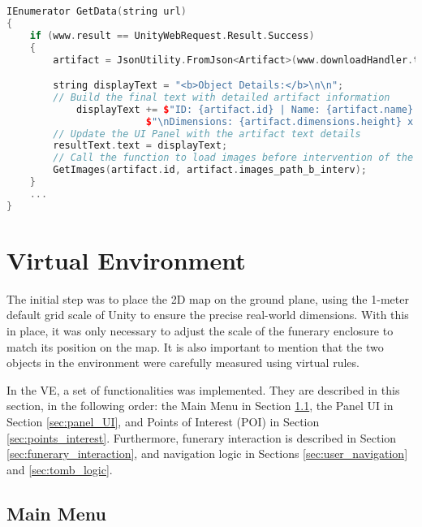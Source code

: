 \begin{lstlisting}[language=C++,label={lst:get_data}, caption={Method used to load object data from the database},float]
    IEnumerator GetData(string url)
{   
    if (www.result == UnityWebRequest.Result.Success)
    {
        artifact = JsonUtility.FromJson<Artifact>(www.downloadHandler.text);

        string displayText = "<b>Object Details:</b>\n\n";
        // Build the final text with detailed artifact information
            displayText += $"ID: {artifact.id} | Name: {artifact.name} \nMaterial: {artifact.material} | Epoch: {artifact.epoch} \nProvenance: {artifact.provenance}" +
                        $"\nDimensions: {artifact.dimensions.height} x {artifact.dimensions.width} cm, Weight: {Mathf.Round(artifact.dimensions.weight * 10.0f) * 0.1f} g";
        // Update the UI Panel with the artifact text details
        resultText.text = displayText;
        // Call the function to load images before intervention of the artifact
        GetImages(artifact.id, artifact.images_path_b_interv);
    }
    ...
}
\end{lstlisting}


\section{Virtual Environment}
\label{sec:implementation}
The initial step was to place the \gls{2D} map on the ground plane, using the 1-meter default grid scale of Unity to ensure the precise real-world dimensions. With this in place, it was only necessary to adjust the scale of the funerary enclosure to match its position on the map. It is also important to mention that the two objects in the environment were carefully measured using virtual rules.

In the \gls{VE}, a set of functionalities was implemented. 
They are described in this section, in the following order: the Main Menu in Section \ref{sec:main_menu}, the Panel \gls{UI} in Section \ref{sec:panel_UI}, and Points of Interest (\gls{POI}) in Section \ref{sec:points_interest}. 
Furthermore, funerary interaction is described in Section \ref{sec:funerary_interaction}, and navigation logic in Sections \ref{sec:user_navigation} and \ref{sec:tomb_logic}.

\subsection{Main Menu}
\label{sec:main_menu}

